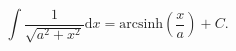 $$ 
  \int \frac{1}{\sqrt {a^2 + x^2 } } \mathrm{d}x 
  = \mathrm{arcsinh} \left ( \frac{x}{a} \right ) + C .
  $$